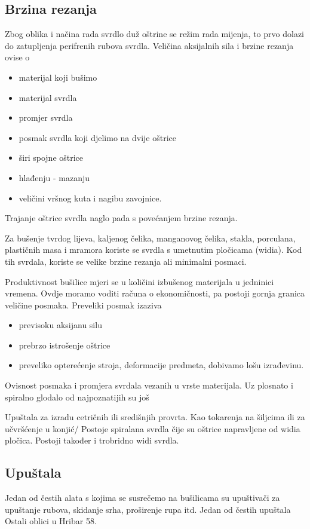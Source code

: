 \documentclass[a4paper,12pt]{article}
\numberwithin{figure}{section}
\begin{document}
\subsection{Brzina rezanja}
Zbog oblika i načina rada svrdlo duž oštrine se režim rada mijenja, to prvo dolazi do zatupljenja perifrenih rubova svrdla. Veličina aksijalnih sila i brzine rezanja ovise o 
\begin{itemize}
\item materijal koji bušimo
\item materijal svrdla
\item promjer svrdla
\item posmak svrdla koji djelimo na dvije oštrice
\item širi spojne oštrice 
\item hlađenju - mazanju
\item veličini vršnog kuta i nagibu zavojnice.
\end{itemize}
Trajanje oštrice svrdla naglo pada s povećanjem brzine rezanja.\par
Za bušenje tvrdog lijeva, kaljenog čelika, manganovog čelika, stakla, porculana, plastičnih masa i mramora koriste se svrdla s umetnutim pločicama (widia). Kod tih svrdala, koriste se velike brzine rezanja ali minimalni posmaci.\par
Produktivnost bušilice mjeri se u količini izbušenog materijala u jedninici vremena. Ovdje moramo voditi računa o ekonomičnosti, pa postoji gornja granica veličine posmaka. Preveliki posmak izaziva
\begin{itemize}
\item previsoku aksijanu silu
\item prebrzo istrošenje oštrice
\item preveliko opterećenje stroja, deformacije predmeta, dobivamo lošu izrađevinu.
\end{itemize}
Ovisnost posmaka i promjera svrdala vezanih u vrste materijala.
Uz plosnato i spiralno glodalo od najpoznatijih su još

Upuštala za izradu cetričnih ili središnjih provrta. Kao tokarenja na šiljcima ili za učvršćenje u konjić/
Postoje spiralana svrdla čije su oštrice napravljene od widia pločica. Postoji također i trobridno widi svrdla.
\subsection{Upuštala}
Jedan od čestih alata s kojima se susrečemo na bušilicama su upuštivači za upuštanje rubova, skidanje srha, proširenje rupa itd. Jedan od čestih upuštala
Ostali oblici u Hribar 58.
\end{document}
